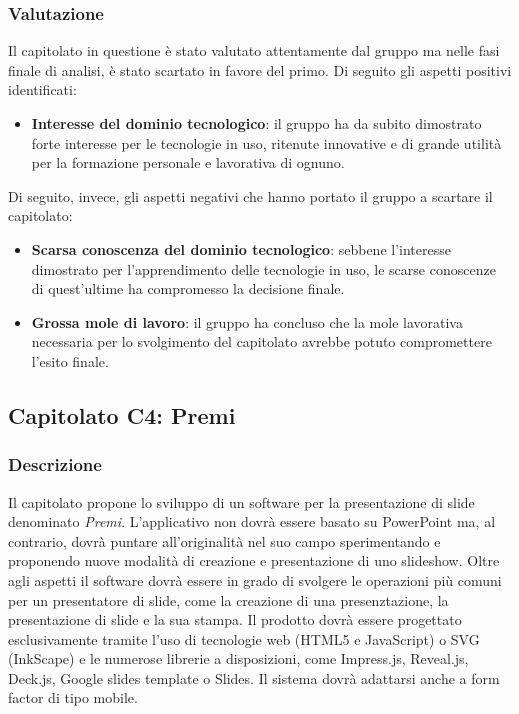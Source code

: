 \subsubsection{Valutazione}
Il capitolato in questione è stato valutato attentamente dal gruppo ma nelle fasi finale di analisi, è stato scartato in favore del primo. Di seguito gli aspetti positivi identificati:
\begin{itemize}
\item \textbf{Interesse del dominio tecnologico}: il gruppo ha da subito dimostrato forte interesse per le tecnologie in uso, ritenute innovative e di grande utilità per la formazione personale e lavorativa di ognuno.
\end{itemize}
Di seguito, invece, gli aspetti negativi che hanno portato il gruppo a scartare il capitolato:
\begin{itemize}
\item \textbf{Scarsa conoscenza del dominio tecnologico}: sebbene l'interesse dimostrato per l'apprendimento delle tecnologie in uso, le scarse conoscenze di quest'ultime ha compromesso la decisione finale.
\item \textbf{Grossa mole di lavoro}: il gruppo ha concluso che la mole lavorativa necessaria per lo svolgimento del capitolato avrebbe potuto compromettere l'esito finale.
\end{itemize}


\subsection{Capitolato C4: Premi}

\subsubsection{Descrizione}
Il capitolato propone lo sviluppo di un software per la presentazione di slide denominato \emph{Premi}. L'applicativo non dovrà essere basato su PowerPoint ma, al contrario, dovrà puntare all'originalità nel suo campo sperimentando e proponendo nuove modalità di creazione e presentazione di uno slideshow. Oltre agli aspetti il software dovrà essere in grado di svolgere le operazioni più comuni per un presentatore di slide, come la creazione di una presenztazione, la presentazione di slide e la sua stampa.
Il prodotto dovrà essere progettato esclusivamente tramite l'uso di tecnologie web (HTML5 e JavaScript) o SVG (InkScape) e le numerose librerie a disposizioni, come Impress.js, Reveal.js, Deck.js, Google slides template o Slides. Il sistema dovrà adattarsi anche a form factor di tipo mobile.

